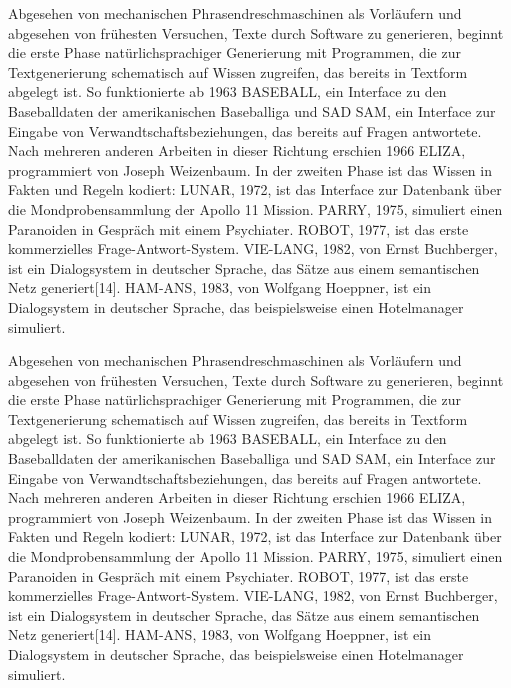 \documentclass[11pt, a4paper, oneside, twocolumn]{article} %
\begin{document}
Abgesehen von mechanischen Phrasendreschmaschinen als Vorläufern und abgesehen von frühesten Versuchen, Texte durch Software zu generieren, beginnt die erste Phase natürlichsprachiger Generierung mit Programmen, die zur Textgenerierung schematisch auf Wissen zugreifen, das bereits in Textform abgelegt ist. So funktionierte ab 1963 BASEBALL, ein Interface zu den Baseballdaten der amerikanischen Baseballiga und SAD SAM, ein Interface zur Eingabe von Verwandtschaftsbeziehungen, das bereits auf Fragen antwortete. Nach mehreren anderen Arbeiten in dieser Richtung erschien 1966 ELIZA, programmiert von Joseph Weizenbaum. In der zweiten Phase ist das Wissen in Fakten und Regeln kodiert: LUNAR, 1972, ist das Interface zur Datenbank über die Mondprobensammlung der Apollo 11 Mission. PARRY, 1975, simuliert einen Paranoiden in Gespräch mit einem Psychiater. ROBOT, 1977, ist das erste kommerzielles Frage-Antwort-System. VIE-LANG, 1982, von Ernst Buchberger, ist ein Dialogsystem in deutscher Sprache, das Sätze aus einem semantischen Netz generiert[14]. HAM-ANS, 1983, von Wolfgang Hoeppner, ist ein Dialogsystem in deutscher Sprache, das beispielsweise einen Hotelmanager simuliert.

Abgesehen von mechanischen Phrasendreschmaschinen als Vorläufern und abgesehen von frühesten Versuchen, Texte durch Software zu generieren, beginnt die erste Phase natürlichsprachiger Generierung mit Programmen, die zur Textgenerierung schematisch auf Wissen zugreifen, das bereits in Textform abgelegt ist. So funktionierte ab 1963 BASEBALL, ein Interface zu den Baseballdaten der amerikanischen Baseballiga und SAD SAM, ein Interface zur Eingabe von Verwandtschaftsbeziehungen, das bereits auf Fragen antwortete. Nach mehreren anderen Arbeiten in dieser Richtung erschien 1966 ELIZA, programmiert von Joseph Weizenbaum. In der zweiten Phase ist das Wissen in Fakten und Regeln kodiert: LUNAR, 1972, ist das Interface zur Datenbank über die Mondprobensammlung der Apollo 11 Mission. PARRY, 1975, simuliert einen Paranoiden in Gespräch mit einem Psychiater. ROBOT, 1977, ist das erste kommerzielles Frage-Antwort-System. VIE-LANG, 1982, von Ernst Buchberger, ist ein Dialogsystem in deutscher Sprache, das Sätze aus einem semantischen Netz generiert[14]. HAM-ANS, 1983, von Wolfgang Hoeppner, ist ein Dialogsystem in deutscher Sprache, das beispielsweise einen Hotelmanager simuliert.
\end{document}
